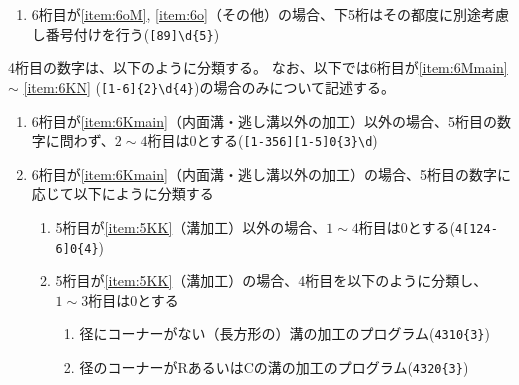 \begin{enumerate}[label=\alph*)]
\begin{enumerate}[label=\arabic*., ref=\arabic*]
  \item\label{item:5KF} 端面の加工のプログラム(\verb|41\d{4}|)
  \item\label{item:5KO} 外削の加工のプログラム(\verb|42\d{4}|)
  \item\label{item:5KK} 溝の加工のプログラム(\verb|43\d{4}|)
  \item\label{item:5KCO} 外側面取の加工のプログラム(\verb|44\d{4}|)
  \item\label{item:5KCI} 内側面取の加工のプログラム(\verb|45\d{4}|)
  \item\label{item:5KZ} 座ぐりの加工のプログラム(\verb|46\d{4}|)
  \end{enumerate}
\item 6桁目が\ref{item:6oM}, \ref{item:6o}（その他）の場合、下5桁はその都度に別途考慮し番号付けを行う(\verb|[89]\d{5}|)
\end{enumerate}


4桁目の数字は、以下のように分類する。
なお、以下では6桁目が\ref{item:6Mmain} $\sim$ \ref{item:6KN} (\verb|[1-6]{2}\d{4}|)の場合のみについて記述する。
\begin{enumerate}[label=\alph*), ref=\alph*)]
\item 6桁目が\ref{item:6Kmain}（内面溝・逃し溝以外の加工）以外の場合、5桁目の数字に問わず、$2\sim4$桁目は0とする(\verb|[1-356][1-5]0{3}\d|)
\item 6桁目が\ref{item:6Kmain}（内面溝・逃し溝以外の加工）の場合、5桁目の数字に応じて以下にように分類する
  \begin{enumerate}[label=\alph{enumi}\,-\arabic*), leftmargin=\leftmargini]
  \item 5桁目が\ref{item:5KK}（溝加工）以外の場合、$1\sim4$桁目は0とする(\verb|4[124-6]0{4}|)
  \item 5桁目が\ref{item:5KK}（溝加工）の場合、4桁目を以下のように分類し、$1\sim3$桁目は0とする
    \begin{enumerate}[label=\arabic*., ref=\arabic*, leftmargin=*]
    \item 径にコーナーがない（長方形の）溝の加工のプログラム(\verb|4310{3}|)
    \item 径のコーナーがRあるいはCの溝の加工のプログラム(\verb|4320{3}|)
    \end{enumerate}
  \end{enumerate}
\end{enumerate}



